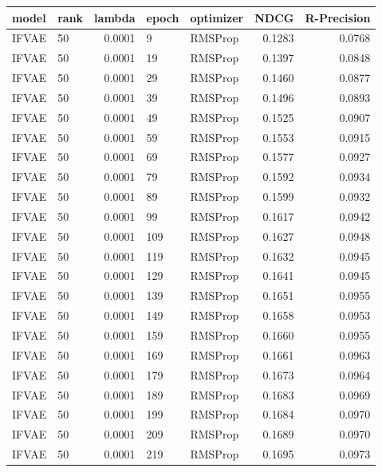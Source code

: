 \begin{tabular}{llrllrr}
\toprule
 model & rank &  lambda & epoch & optimizer &    NDCG &  R-Precision \\
\midrule
 IFVAE &   50 &  0.0001 &     9 &   RMSProp &  0.1283 &       0.0768 \\
 IFVAE &   50 &  0.0001 &    19 &   RMSProp &  0.1397 &       0.0848 \\
 IFVAE &   50 &  0.0001 &    29 &   RMSProp &  0.1460 &       0.0877 \\
 IFVAE &   50 &  0.0001 &    39 &   RMSProp &  0.1496 &       0.0893 \\
 IFVAE &   50 &  0.0001 &    49 &   RMSProp &  0.1525 &       0.0907 \\
 IFVAE &   50 &  0.0001 &    59 &   RMSProp &  0.1553 &       0.0915 \\
 IFVAE &   50 &  0.0001 &    69 &   RMSProp &  0.1577 &       0.0927 \\
 IFVAE &   50 &  0.0001 &    79 &   RMSProp &  0.1592 &       0.0934 \\
 IFVAE &   50 &  0.0001 &    89 &   RMSProp &  0.1599 &       0.0932 \\
 IFVAE &   50 &  0.0001 &    99 &   RMSProp &  0.1617 &       0.0942 \\
 IFVAE &   50 &  0.0001 &   109 &   RMSProp &  0.1627 &       0.0948 \\
 IFVAE &   50 &  0.0001 &   119 &   RMSProp &  0.1632 &       0.0945 \\
 IFVAE &   50 &  0.0001 &   129 &   RMSProp &  0.1641 &       0.0945 \\
 IFVAE &   50 &  0.0001 &   139 &   RMSProp &  0.1651 &       0.0955 \\
 IFVAE &   50 &  0.0001 &   149 &   RMSProp &  0.1658 &       0.0953 \\
 IFVAE &   50 &  0.0001 &   159 &   RMSProp &  0.1660 &       0.0955 \\
 IFVAE &   50 &  0.0001 &   169 &   RMSProp &  0.1661 &       0.0963 \\
 IFVAE &   50 &  0.0001 &   179 &   RMSProp &  0.1673 &       0.0964 \\
 IFVAE &   50 &  0.0001 &   189 &   RMSProp &  0.1683 &       0.0969 \\
 IFVAE &   50 &  0.0001 &   199 &   RMSProp &  0.1684 &       0.0970 \\
 IFVAE &   50 &  0.0001 &   209 &   RMSProp &  0.1689 &       0.0970 \\
 IFVAE &   50 &  0.0001 &   219 &   RMSProp &  0.1695 &       0.0973 \\

\end{tabular}
